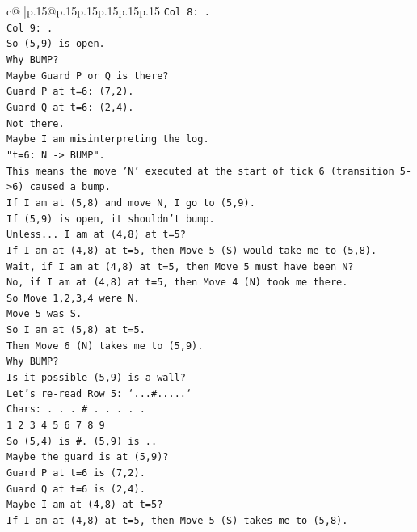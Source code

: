 \documentclass{article}
\begin{document}
{\begin{supertabular}{c@{$\;$}|p{.15\linewidth}@{}p{.15\linewidth}p{.15\linewidth}p{.15\linewidth}p{.15\linewidth}p{.15\linewidth}}
{{{\texttt{Col 8: .} \\
\texttt{Col 9: .} \\
\texttt{So (5,9) is open.} \\
\texttt{Why BUMP?} \\
\texttt{Maybe Guard P or Q is there?} \\
\texttt{Guard P at t=6: (7,2).} \\
\texttt{Guard Q at t=6: (2,4).} \\
\texttt{Not there.} \\
\texttt{Maybe I am misinterpreting the log.} \\
\texttt{"t=6: N {-}> BUMP".} \\
\texttt{This means the move 'N' executed at the start of tick 6 (transition 5{-}>6) caused a bump.} \\
\texttt{If I am at (5,8) and move N, I go to (5,9).} \\
\texttt{If (5,9) is open, it shouldn't bump.} \\
\texttt{Unless... I am at (4,8) at t=5?} \\
\texttt{If I am at (4,8) at t=5, then Move 5 (S) would take me to (5,8).} \\
\texttt{Wait, if I am at (4,8) at t=5, then Move 5 must have been N?} \\
\texttt{No, if I am at (4,8) at t=5, then Move 4 (N) took me there.} \\
\texttt{So Move 1,2,3,4 were N.} \\
\texttt{Move 5 was S.} \\
\texttt{So I am at (5,8) at t=5.} \\
\texttt{Then Move 6 (N) takes me to (5,9).} \\
\texttt{Why BUMP?} \\
\texttt{Is it possible (5,9) is a wall?} \\
\texttt{Let's re{-}read Row 5: `...\#.....`} \\
\texttt{Chars: . . . \# . . . . .} \\
\texttt{1 2 3 4 5 6 7 8 9} \\
\texttt{So (5,4) is \#. (5,9) is ..} \\
\texttt{Maybe the guard is at (5,9)?} \\
\texttt{Guard P at t=6 is (7,2).} \\
\texttt{Guard Q at t=6 is (2,4).} \\
\texttt{Maybe I am at (4,8) at t=5?} \\
\texttt{If I am at (4,8) at t=5, then Move 5 (S) takes me to (5,8).} \\
}}}
\end{supertabular}}
\end{document}
